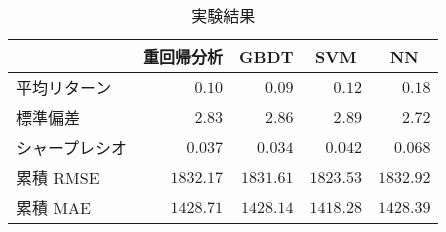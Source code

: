 \begin{table}[!htbp]
\begin{center}\small
\begin{tabular}{lrrrr}
\hline\hline
\multicolumn{1}{c}{ }&\multicolumn{1}{c}{重回帰分析}&\multicolumn{1}{c}{GBDT}&\multicolumn{1}{c}{SVM}&\multicolumn{1}{c}{NN}\tabularnewline
\hline
平均リターン&$   0.10$&$   0.09$&$   0.12$&$   0.18$\tabularnewline
標準偏差&$   2.83$&$   2.86$&$   2.89$&$   2.72$\tabularnewline
シャープレシオ&$   0.037$&$   0.034$&$   0.042$&$   0.068$\tabularnewline
累積 RMSE&$1832.17$&$1831.61$&$1823.53$&$1832.92$\tabularnewline
累積 MAE&$1428.71$&$1428.14$&$1418.28$&$1428.39$\tabularnewline
\hline
\end{tabular}\end{center}
\caption{実験結果\label{}} 
\end{table}

